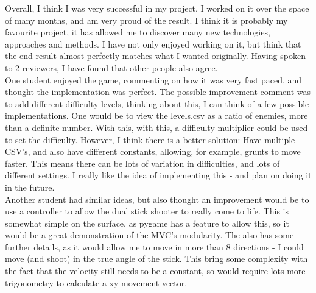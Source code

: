 
Overall, I think I was very successful in my project. I worked on it over the space of many months, and am very proud of the result. I think it is probably my favourite project, it has allowed me to discover many new technologies, approaches and methods. I have not only enjoyed working on it, but think that the end result almost perfectly matches what I wanted originally. Having spoken to 2 reviewers, I have found that other people also agree. \\

One student enjoyed the game, commenting on how it was very fast paced, and thought the implementation was perfect. The possible improvement comment was to add different difficulty levels, thinking about this, I can think of a few possible implementations. One would be to view the levels.csv as a ratio of enemies, more than a definite number. With this, with this, a difficulty multiplier could be used to set the difficulty. However, I think there is a better solution: Have multiple CSV's, and also have different constants, allowing, for example, grunts to move faster. This means there can be lots of variation in difficulties, and lots of different settings. I really like the idea of implementing this - and plan on doing it in the future.\\

Another student had similar ideas, but also thought an improvement would be to use a controller to allow the dual stick shooter to really come to life. This is somewhat simple on the surface, as pygame has a feature to allow this, so it would be a great demonstration of the MVC's modularity. The also has some further details, as it would allow me to move in more than 8 directions - I could move (and shoot) in the true angle of the stick. This bring some complexity with the fact that the velocity still needs to be a constant, so would require lots more trigonometry to calculate a xy movement vector.\\

